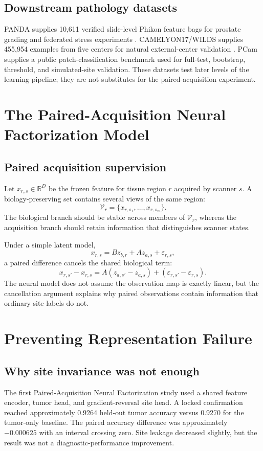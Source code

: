 \documentclass[10pt]{article}
\begin{document}
\subsection{Downstream pathology datasets}
PANDA supplies 10,611 verified slide-level Phikon feature bags for prostate grading and federated stress experiments \citep{bulten2022artificial}. CAMELYON17/WILDS supplies 455,954 examples from five centers for natural external-center validation \citep{bandi2018camelyon17,koh2021wilds}. PCam supplies a public patch-classification benchmark used for full-test, bootstrap, threshold, and simulated-site validation. These datasets test later levels of the learning pipeline; they are not substitutes for the paired-acquisition experiment.

\section{The Paired-Acquisition Neural Factorization Model}
\subsection{Paired acquisition supervision}
Let $x_{r,s}\in\mathbb{R}^{D}$ be the frozen feature for tissue region $r$ acquired by scanner $s$. A biology-preserving set contains several views of the same region:
\[
\mathcal{V}_r=\{x_{r,s_1},\ldots,x_{r,s_m}\}.
\]
The biological branch should be stable across members of $\mathcal{V}_r$, whereas the acquisition branch should retain information that distinguishes scanner states.

Under a simple latent model,
\[
x_{r,s}=Bz_{b,r}+Az_{a,s}+\varepsilon_{r,s},
\]
a paired difference cancels the shared biological term:
\[
x_{r,s'}-x_{r,s}=A(z_{a,s'}-z_{a,s})+(\varepsilon_{r,s'}-\varepsilon_{r,s}).
\]
The neural model does not assume the observation map is exactly linear, but the cancellation argument explains why paired observations contain information that ordinary site labels do not.



\section{Preventing Representation Failure}
\subsection{Why site invariance was not enough}
The first Paired-Acquisition Neural Factorization study used a shared feature encoder, tumor head, and gradient-reversal site head. A locked confirmation reached approximately 0.9264 held-out tumor accuracy versus 0.9270 for the tumor-only baseline. The paired accuracy difference was approximately $-0.000625$ with an interval crossing zero. Site leakage decreased slightly, but the result was not a diagnostic-performance improvement.
\end{document}
